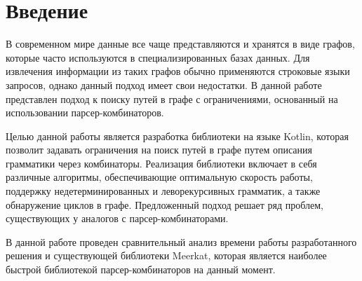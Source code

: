 \chapter*{Введение}                         %

В современном мире данные все чаще представляются и хранятся в виде графов, которые часто используются в специализированных базах данных. Для извлечения информации из таких графов обычно применяются строковые языки запросов, однако данный подход имеет свои недостатки. В данной работе представлен подход к поиску путей в графе с ограничениями, основанный на использовании парсер-комбинаторов.

Целью данной работы является разработка библиотеки на языке Kotlin, которая позволит задавать ограничения на поиск путей в графе путем описания грамматики через комбинаторы. Реализация библиотеки включает в себя различные алгоритмы, обеспечивающие оптимальную скорость работы, поддержку недетерминированных и леворекурсивных грамматик, а также обнаружение циклов в графе. Предложенный подход решает ряд проблем, существующих у аналогов с парсер-комбинаторами.

В данной работе проведен сравнительный анализ времени работы разработанного решения и существующей библиотеки Meerkat, которая является наиболее быстрой библиотекой парсер-комбинаторов на данный момент. 